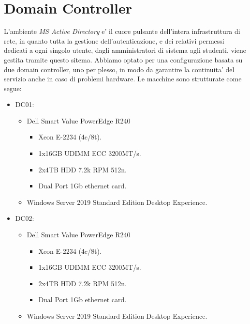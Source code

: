 \documentclass{report}
\begin{document}
        \section{Domain Controller}
        L'ambiente \emph{MS Active Directory} e' il cuore pulsante dell'intera infrastruttura di rete, in quanto tutta 
         la gestione dell'autenticazione, e dei relativi permessi dedicati a ogni singolo utente, dagli amministratori
         di sistema agli studenti, viene gestita tramite questo sitema.
        Abbiamo optato per una configurazione basata su due domain controller, uno per plesso, in modo da garantire la
         continuita' del servizio anche in caso di problemi hardware.
        Le macchine sono strutturate come segue:
        \begin{itemize}
        \item DC01:
            \begin{itemize}
            \item Dell Smart Value PowerEdge R240
                \begin{itemize}
                    \item Xeon E-2234 (4c/8t).
                    \item 1x16GB UDIMM ECC 3200MT/s.
                    \item 2x4TB HDD 7.2k RPM 512n.
                    \item Dual Port 1Gb ethernet card.
                \end{itemize}
            \item Windows Server 2019 Standard Edition Desktop Experience.
            \end{itemize}\newpage
        \item DC02: 
            \begin{itemize}
            \item Dell Smart Value PowerEdge R240
                \begin{itemize}
                    \item Xeon E-2234 (4c/8t).
                    \item 1x16GB UDIMM ECC 3200MT/s.
                    \item 2x4TB HDD 7.2k RPM 512n.
                    \item Dual Port 1Gb ethernet card.
                \end{itemize}
            \item Windows Server 2019 Standard Edition Desktop Experience.
            \end{itemize}
        \end{itemize}
\end{document}

